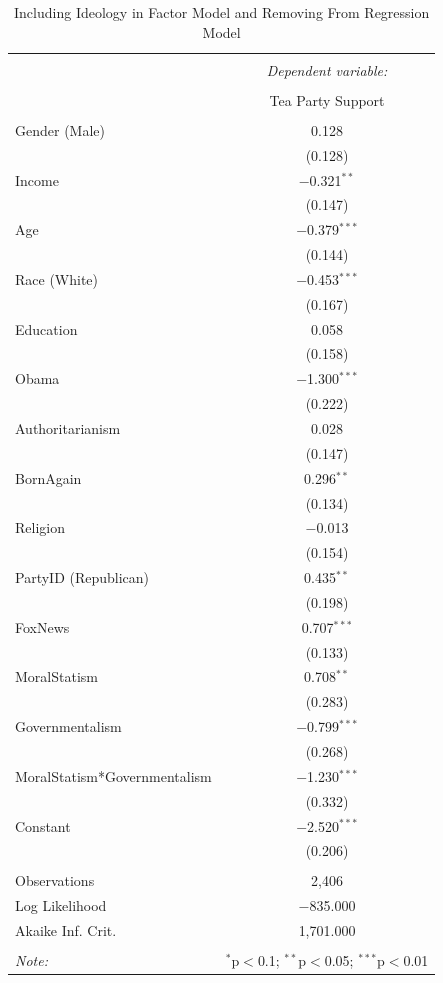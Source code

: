 \documentclass[12pt,]{article}
\begin{document}
\begin{table}[!htbp] \centering 
  \caption{Including Ideology in Factor Model and Removing From Regression Model} 
  \label{} 
\footnotesize 
\begin{tabular}{@{\extracolsep{5pt}}lc} 
\\[-1.8ex]\hline 
\hline \\[-1.8ex] 
 & \multicolumn{1}{c}{\textit{Dependent variable:}} \\ 
\cline{2-2} 
\\[-1.8ex] & Tea Party Support \\ 
\hline \\[-1.8ex] 
 Gender (Male) & 0.128 \\ 
  & (0.128) \\ 
  Income & $-$0.321$^{**}$ \\ 
  & (0.147) \\ 
  Age & $-$0.379$^{***}$ \\ 
  & (0.144) \\ 
  Race (White) & $-$0.453$^{***}$ \\ 
  & (0.167) \\ 
  Education & 0.058 \\ 
  & (0.158) \\ 
  Obama & $-$1.300$^{***}$ \\ 
  & (0.222) \\ 
  Authoritarianism & 0.028 \\ 
  & (0.147) \\ 
  BornAgain & 0.296$^{**}$ \\ 
  & (0.134) \\ 
  Religion & $-$0.013 \\ 
  & (0.154) \\ 
  PartyID (Republican) & 0.435$^{**}$ \\ 
  & (0.198) \\ 
  FoxNews & 0.707$^{***}$ \\ 
  & (0.133) \\ 
  MoralStatism & 0.708$^{**}$ \\ 
  & (0.283) \\ 
  Governmentalism & $-$0.799$^{***}$ \\ 
  & (0.268) \\ 
  MoralStatism*Governmentalism & $-$1.230$^{***}$ \\ 
  & (0.332) \\ 
  Constant & $-$2.520$^{***}$ \\ 
  & (0.206) \\ 
 \hline \\[-1.8ex] 
Observations & 2,406 \\ 
Log Likelihood & $-$835.000 \\ 
Akaike Inf. Crit. & 1,701.000 \\ 
\hline 
\hline \\[-1.8ex] 
\textit{Note:}  & \multicolumn{1}{r}{$^{*}$p$<$0.1; $^{**}$p$<$0.05; $^{***}$p$<$0.01} \\ 
\end{tabular} 
\end{table}
\end{document}
